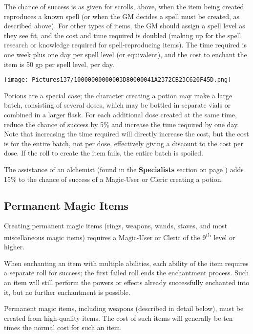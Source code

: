 \documentclass[a4paper,twoside,openany,10pt]{book}
\begin{document}
\begin{multicols}{2}
The chance of success is as given for scrolls, above, when the item being created reproduces a known spell (or when the GM decides a spell must be created, as described above). For other types of items, the GM should assign a spell level as they see fit, and the cost and time required is doubled (making up for the spell research or knowledge required for spell-reproducing items). The time required is one week plus one day per spell level (or equivalent), and the cost to enchant the item is 50 gp per spell level, per day.

\begin{center}
	\texttt{[image: Pictures137/10000000000003D80000041A2372CB23C620F45D.png]}
\end{center}

Potions are a special case; the character creating a potion may make a large batch, consisting of several doses, which may be bottled in separate vials or combined in a larger flask. For each additional dose created at the same time, reduce the chance of success by 5\% and increase the time required by one day. Note that increasing the time required will directly increase the cost, but the cost is for the entire batch, not per dose, effectively giving a discount to the cost per dose. If the roll to create the item fails, the entire batch is spoiled.

The assistance of an alchemist (found in the \textbf{Specialists} section on page \hyperlink{Alchemistux20Entry}{\pageref{Alchemistux20Entry}}) adds 15\% to the chance of success of a Magic-User or Cleric creating a potion.

\subsection{Permanent Magic Items}\label{permanent-magic-items}

Creating permanent magic items (rings, weapons, wands, staves, and most miscellaneous magic items) requires a Magic-User or Cleric of the 9\textsuperscript{th} level or higher.

When enchanting an item with multiple abilities, each ability of the item requires a separate roll for success; the first failed roll ends the enchantment process. Such an item will still perform the powers or effects already successfully enchanted into it, but no further enchantment is possible.

Permanent magic items, including weapons (described in detail below), must be created from high-quality items. The cost of such items will generally be ten times the normal cost for such an item.


\end{multicols}
\end{document}
